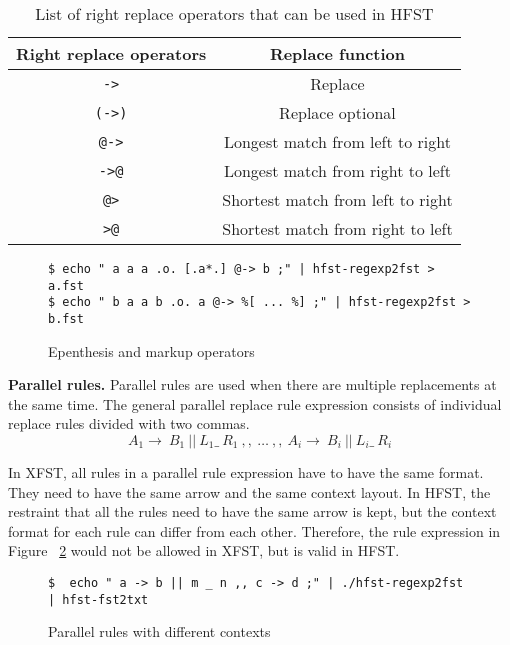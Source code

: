 \documentclass{llncs}
\begin{document}
\begin{table} [h!]
\centering
\caption{List of right replace operators that can be used in HFST}
\begin{tabular}{| c | c |} 
\hline
Right replace operators & Replace function \\ \hline\hline
\verb!->!   & Replace \\ \hline
\verb!(->)! & Replace optional \\ \hline
\verb!@->!  & Longest match from left to right \\ \hline
\verb!->@!  & Longest match from right to left \\ \hline
\verb!@>!   & Shortest match from left to right \\ \hline
\verb!>@!   & Shortest match from right to left \\ \hline
\end{tabular}
\label{tab:replace_operators}
\end{table}



\begin{figure} [h!]
 \begin{verbatim}
$ echo " a a a .o. [.a*.] @-> b ;" | hfst-regexp2fst > a.fst
$ echo " b a a b .o. a @-> %[ ... %] ;" | hfst-regexp2fst > b.fst
\end{verbatim}
\caption{Epenthesis and markup operators}
\label{fig:epenthesis_markup}
\end{figure}



\textbf{Parallel rules.} Parallel rules are used when there are multiple replacements at the same time. The general parallel replace rule expression consists of individual replace rules divided with two commas.
\begin{equation}
A_1 \rightarrow\ B_1\ ||\ L_1 \_\  R_1\ ,,\ \ldots\ ,,\ A_i \rightarrow\ B_i\ ||\ L_i \_\ R_i
\end{equation}

In XFST, all rules in a parallel rule expression have to have the same format. They need to have the same arrow and the same context layout. In HFST, the restraint that all the rules need to have the same arrow is kept, but the context format for each rule can differ from each other. Therefore, the rule expression in Figure ~\ref{fig:parallel_rules} would not be allowed in XFST, but is valid in HFST.
\begin{figure}
 \begin{verbatim}
$  echo " a -> b || m _ n ,, c -> d ;" | ./hfst-regexp2fst | hfst-fst2txt
\end{verbatim}
\caption{Parallel rules with different contexts}
\label{fig:parallel_rules}
\end{figure}
\end{document}
